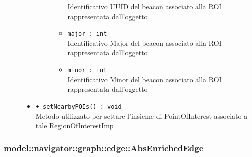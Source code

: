 \documentclass[../DefinizioneDiProdotto.tex]{subfiles}
\begin{document}
\begin{description}
\begin{itemize}
\begin{description}
\begin{itemize}
Identificativo UUID del beacon associato alla ROI rappresentata dall'oggetto\item \texttt{major : int}\\
Identificativo Major del beacon associato alla ROI rappresentata dall'oggetto\item \texttt{minor : int}\\
Identificativo Minor del beacon associato alla ROI rappresentata dall'oggetto\end{itemize}
\end{description}
\item \texttt{+ setNearbyPOIs() : void}\\
Metodo utilizzato per settare l'insieme di PointOfInterest associato a tale RegionOfInterestImp
 \end{itemize}
\end{description}

\subsubsection{model::navigator::graph::edge::AbsEnrichedEdge}
\end{document}
